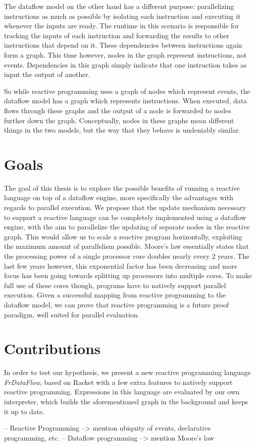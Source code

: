 The dataflow model on the other hand has a different purpose: parallelizing instructions as much as possible by isolating each instruction and executing it whenever the inputs are ready. The runtime in this scenario is responsible for tracking the inputs of each instruction and forwarding the results to other instructions that depend on it. These dependencies between instructions again form a graph. This time however, nodes in the graph represent instructions, not events. Dependencies in this graph simply indicate that one instruction takes as input the output of another. 

So while reactive programming uses a graph of nodes which represent events, the dataflow model has a graph which represents instructions. When executed, data flows through these graphs and the output of a node is forwarded to nodes further down the graph. Conceptually, nodes in these graphs mean different things in the two models, but the way that they behave is undeniably similar.

\section{Goals}

The goal of this thesis is to explore the possible benefits of running a reactive language on top of a dataflow engine, more specifically the advantages with regards to parallel execution. We propose that the update mechanism necessary to support a reactive language can be completely implemented using a dataflow engine, with the aim to parallelize the updating of separate nodes in the reactive graph. 
This would allow us to scale a reactive program horizontally, exploiting the maximum amount of parallelism possible. Moore's law essentially states that the processing power of a single processor core doubles nearly every 2 years. The last few years however, this exponential factor has been decreasing and more focus has been going towards splitting up processors into multiple cores. To make full use of these cores though, programs have to natively support parallel execution. 
Given a successful mapping from reactive programming to the dataflow model, we can prove that reactive programming is a future proof paradigm, well suited for parallel evaluation. 

\section{Contributions}

In order to test our hypothesis, we present a new reactive programming language \textit{FrDataFlow}, based on Racket with a few extra features to natively support reactive programming. Expressions in this language are evaluated by our own interpreter, which builds the aforementioned graph in the background and keeps it up to date. 



-- Reactive Programming --> mention ubiquity of events, declarative programming, etc.
-- Dataflow programming --> mention Moore's law